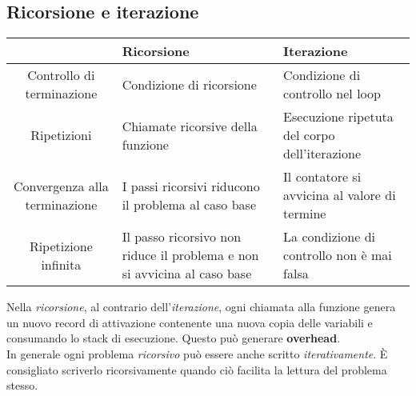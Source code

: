 \subsection{Ricorsione e iterazione}
\begin{tabular} { |c|p{150px}|p{150px}|}
	\hline
	& \textbf{Ricorsione} & \textbf{Iterazione} \\
	\hline
	Controllo di terminazione & Condizione di ricorsione & Condizione di controllo nel loop \\
	\hline
	Ripetizioni & Chiamate ricorsive della funzione & Esecuzione ripetuta del corpo dell'iterazione \\
	\hline
	Convergenza alla terminazione & I passi ricorsivi riducono il problema al caso base & Il contatore si avvicina al valore di termine \\
	\hline
	Ripetizione infinita & Il passo ricorsivo non riduce il problema e non si avvicina al caso base & La condizione di controllo non è mai falsa \\
	\hline
\end{tabular}
\vspace{15pt}

\noindent Nella \emph{ricorsione}, al contrario dell'\emph{iterazione}, ogni chiamata alla funzione genera un nuovo record di attivazione contenente una nuova copia delle variabili e consumando lo stack di esecuzione. Questo può generare \textbf{overhead}.\\
In generale ogni problema \emph{ricorsivo} può essere anche scritto \emph{iterativamente}. È consigliato scriverlo ricorsivamente quando ciò facilita la lettura del problema stesso.